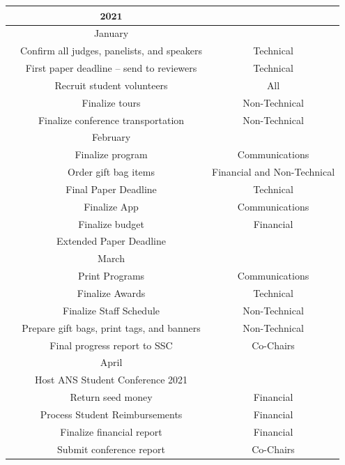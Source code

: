 \begin{center}
\begin{longtable}{c |  c  c}
\hline\hline
&$\textbf{2021}$&\\
\hline\hline
&January&\\
\hline\hline
& Confirm all judges, panelists, and speakers& Technical\\
& First paper deadline -- send to reviewers & Technical\\
& Recruit student volunteers& All\\
& Finalize tours& Non-Technical\\
& Finalize conference transportation& Non-Technical\\
\hline\hline
&February&\\
\hline\hline
& Finalize program& Communications\\
& Order gift bag items & Financial and Non-Technical\\
& Final Paper Deadline& Technical\\
& Finalize App& Communications\\
& Finalize budget& Financial\\
& Extended Paper Deadline& \\
\hline\hline
&March&\\
\hline\hline
& Print Programs& Communications\\
& Finalize Awards& Technical\\
& Finalize Staff Schedule& Non-Technical\\
& Prepare gift bags, print tags, and banners& Non-Technical\\
& Final progress report to SSC& Co-Chairs\\
\hline\hline
&April&\\
\hline\hline
& Host ANS Student Conference 2021 & \\
& Return seed money& Financial\\
& Process Student Reimbursements& Financial\\
& Finalize financial report& Financial\\
& Submit conference report& Co-Chairs\\
\hline\hline
\end{longtable}
\end{center}